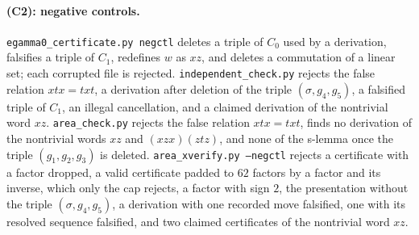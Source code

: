 \paragraph{(C2): negative controls.} \texttt{egamma0\_certificate.py negctl} deletes a triple of $C_0$ used by a derivation, falsifies a
triple of $C_1$, redefines $w$ as $xz$, and deletes a commutation of a linear set; each corrupted file is rejected.
\texttt{independent\_check.py} rejects the false relation $xtx=txt$, a derivation after deletion of the triple $(\sigma,g_4,g_5)$, a
falsified triple of $C_1$, an illegal cancellation, and a claimed derivation of the nontrivial word $xz$. \texttt{area\_check.py} rejects the
false relation $xtx=txt$, finds no derivation of the nontrivial words $xz$ and $(xzx)(ztz)$, and none of the s-lemma once the triple
$(g_1,g_2,g_3)$ is deleted. \texttt{area\_xverify.py --negctl} rejects a certificate with a factor dropped, a valid certificate padded to
$62$ factors by a factor and its inverse, which only the cap rejects, a factor with sign $2$, the presentation without the triple
$(\sigma,g_4,g_5)$, a derivation with one recorded move falsified, one with its resolved sequence falsified, and two claimed certificates
of the nontrivial word $xz$.

